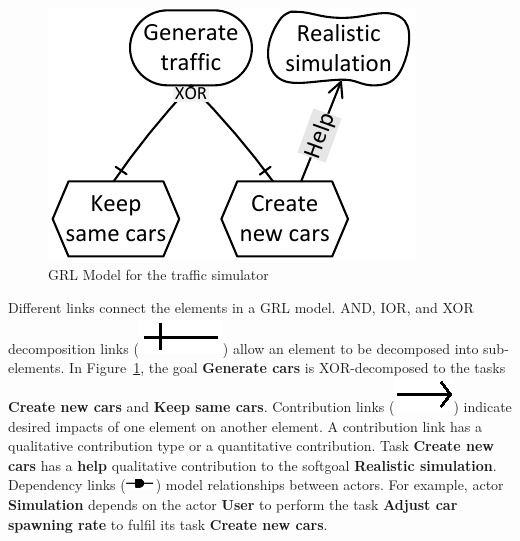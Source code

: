\begin{figure}[ht]
\centering
\includegraphics[scale=0.35]{img/Example}
\caption{GRL Model for the traffic simulator}
\label{fig:trafficsim}
\end{figure}

Different links connect the elements in a GRL model. AND, IOR, and XOR decomposition links (\includegraphics[scale=1]{img/decomposition}) allow an element to be decomposed into sub-elements. In Figure~\ref{fig:trafficsim}, the goal \textbf{Generate cars} is XOR-decomposed to the tasks \textbf{Create new cars} and \textbf{Keep same cars}. Contribution links (\includegraphics[scale=1]{img/contribution}) indicate desired impacts of one element on another element. A contribution link has a qualitative contribution type or a quantitative contribution. Task \textbf{Create new cars} has a \textbf{help} qualitative contribution to the softgoal \textbf{Realistic simulation}. Dependency links (\includegraphics[scale=1]{img/dependency}) model relationships between actors. For example, actor \textbf{Simulation} depends on the actor \textbf{User} to perform the task \textbf{Adjust car spawning rate} to fulfil its task \textbf{Create new cars}.

